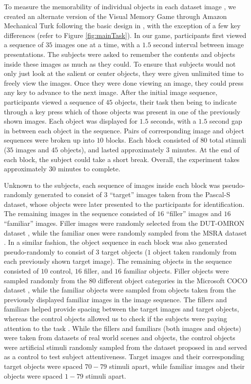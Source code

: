 To measure the memorability of individual objects in each dataset image %
, we created an alternate version of the Visual Memory Game through Amazon Mechanical Turk following the basic design in \cite{isola11}, with the exception of a few key differences (refer to Figure \ref{fig:mainTask}). In our game, participants first viewed a sequence of $35$ images one at a time, with a $1.5$ second interval between image presentations. The subjects were asked to remember the contents and objects inside these images as much as they could. To ensure that subjects would not only just  look at the salient or center objects, they were given unlimited time to freely view the images. Once they were done viewing an image, they could press any key to advance to the next image. After the initial image sequence, participants viewed a sequence of $45$ objects, their task then being to indicate through a key press which of those objects was present in one of the previously shown images. Each object was displayed for $1.5$ seconds, with a $1.5$ second gap in between each object in the sequence. Pairs of corresponding image and object sequences were broken up into $10$ blocks. Each block consisted of $80$ total stimuli ($35$ images and $45$ objects), and lasted approximately $3$ minutes. At the end of each block, the subject could take a short break. Overall, the experiment takes approximately $30$ minutes to complete.

Unknown to the subjects, each sequence of images inside each block was pseudo-randomly generated to consist of $3$ ``target'' images taken from the Pascal-S dataset, whose objects were later presented to the participants for identification. The remaining images in the sequence consisted of $16$ ``filler'' images and $16$ ``familiar'' images.
Filler images were randomly selected from the DUT-OMRON dataset \cite{dutomron13}, while the familiar ones were randomly sampled from the MSRA dataset \cite{msra11}. In a similar fashion, the object sequence in each block was also generated pseudo-randomly to consist of $3$ target objects ($1$ object taken randomly from each previously shown target image). The remaining objects in the sequence consisted of $10$ control, $16$ filler, and $16$ familiar objects. Filler objects were sampled randomly from the $80$ different object categories in the Microsoft COCO dataset \cite{coco14}, while the familiar objects were sampled from objects taken from the previously displayed familiar images in the image sequence. The fillers and familiars helped provide spacing between the target images and target objects, whereas the control objects allowed us to check if the subjects were paying attention to the task \cite{brady08,isola11}. While the fillers and familiars (both images and objects) were taken from datasets of real world scenes and objects, the control objects were artificial stimuli randomly sampled from the dataset proposed in \cite{brady08} and served as a control to test subject attentiveness. Target images and their corresponding target objects were spaced $70-79$ stimuli apart, while familiar images and their objects were spaced $1-79$ stimuli apart. 

